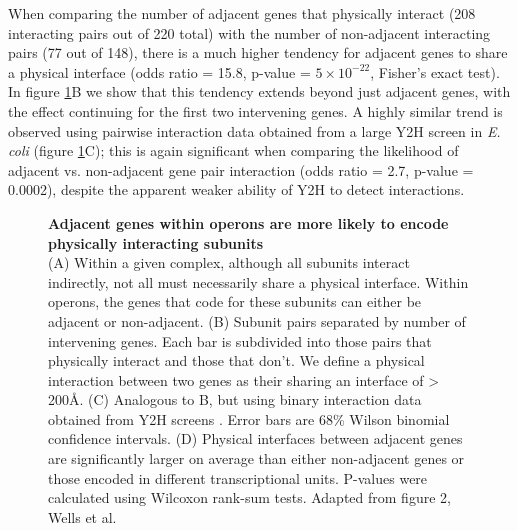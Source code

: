 \documentclass[a4paper,11pt,twoside,openright]{scrbook}
\begin{document}
When comparing the number of adjacent genes that physically interact (208
interacting pairs out of 220 total) with the number of non-adjacent interacting
pairs (77 out of 148), there is a much higher tendency for adjacent genes to
share a physical interface (odds ratio = 15.8, p-value = \(5\times10^{-22}\),
Fisher's exact test). In figure \ref{figure:intervening}B we show that this
tendency extends beyond just adjacent genes, with the effect continuing for the
first two intervening genes. A highly similar trend is observed using pairwise
interaction data obtained from a large Y2H screen in \textit{E. coli}
\cite{Rajagopala2014} (figure \ref{figure:intervening}C); this is again
significant when comparing the likelihood of adjacent vs. non-adjacent gene pair
interaction (odds ratio = 2.7, p-value = 0.0002), despite the apparent weaker
ability of Y2H to detect interactions.

\begin{figure}[h]
    \caption[Adjacent genes within operons are more likely to encode physically
    interacting subunits]{\sffamily \textbf{Adjacent genes within operons are
    more likely to encode physically interacting subunits} \\ \small (A) Within
    a given complex, although all subunits interact indirectly, not all must
    necessarily share a physical interface. Within operons, the genes that code
    for these subunits can either be adjacent or non-adjacent. (B) Subunit pairs
    separated by number of intervening genes. Each bar is subdivided into those
    pairs that physically interact and those that don't. We define a physical
    interaction between two genes as their sharing an interface of > 200Å. (C)
    Analogous to B, but using binary interaction data obtained from Y2H screens
    \cite{Rajagopala2014}. Error bars are 68\% Wilson binomial confidence
    intervals. (D) Physical interfaces between adjacent genes are significantly
    larger on average than either non-adjacent genes or those encoded in
    different transcriptional units. P-values were calculated using Wilcoxon
    rank-sum tests. Adapted from figure 2, Wells et al. \cite{Wells2016}}
    \label{figure:intervening}
\end{figure}
\end{document}
